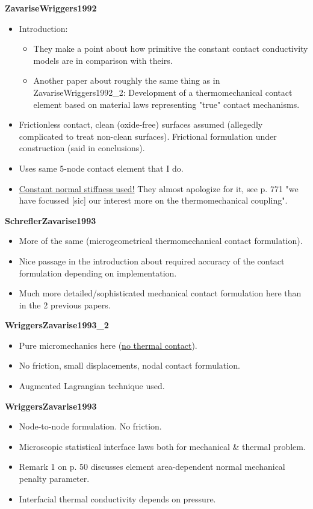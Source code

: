 \documentclass{article}
\begin{document}
\textbf{ZavariseWriggers1992}
\begin{itemize}
\item Introduction:
\begin{itemize}
\item They make a point about how primitive the constant contact conductivity models are in comparison with theirs.
\item Another paper about roughly the same thing as in ZavariseWriggers1992\_2: Development of a thermomechanical contact element based on material laws representing "true" contact mechanisms.
\end{itemize}
\item Frictionless contact, clean (oxide-free) surfaces assumed (allegedly complicated to treat non-clean surfaces). Frictional formulation under construction (said in conclusions).
\item Uses same 5-node contact element that I do.
\item \underline{Constant normal stiffness used!} They almost apologize for it, see p. 771 "we have focussed [sic] our interest more on the thermomechanical coupling".
\end{itemize}

\textbf{SchreflerZavarise1993}
\begin{itemize}
\item More of the same (microgeometrical thermomechanical contact formulation).
\item Nice passage in the introduction about required accuracy of the contact formulation depending on implementation.
\item Much more detailed/sophisticated mechanical contact formulation here than in the 2 previous papers.
\end{itemize}

\textbf{WriggersZavarise1993\_2}
\begin{itemize}
\item Pure micromechanics here (\underline{no thermal contact}).
\item No friction, small displacements, nodal contact formulation.
\item Augmented Lagrangian technique used.
\end{itemize}

\textbf{WriggersZavarise1993}
\begin{itemize}
\item Node-to-node formulation. No friction.
\item Microscopic statistical interface laws both for mechanical \& thermal problem.
\item Remark 1 on p. 50 discusses element area-dependent normal mechanical penalty parameter.
\item Interfacial thermal conductivity depends on pressure.
\end{itemize}
\end{document}
